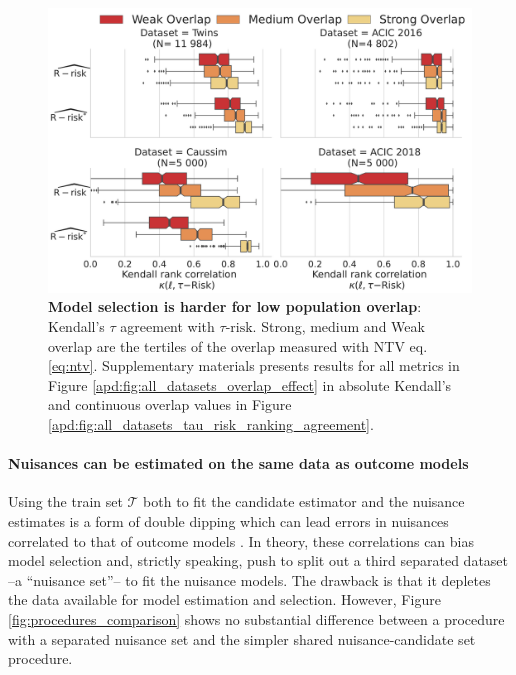 \documentclass[a4paper,num-refs]{oup-contemporary}%
\begin{document}
\begin{figure}[!h]
    \centering\begin{minipage}{\linewidth}
        \includegraphics[width=\linewidth]{_2_overlap_influence_by_bin_k_by_ds_r_risk_2cols.pdf}
    \end{minipage}
    \caption{\textbf{Model selection is harder for low population
            overlap}:
        Kendall's $\tau$ agreement with $\tau\text{-risk}$. Strong, medium and Weak overlap
        are the tertiles of the overlap measured with NTV eq. \ref{eq:ntv}. Supplementary materials presents results for all
        metrics in Figure \ref{apd:fig:all_datasets_overlap_effect} in absolute
        Kendall's and continuous overlap values in Figure
            {\ref{apd:fig:all_datasets_tau_risk_ranking_agreement}}.}\label{fig:all_datasets_overlap_effect_r_risk}
\end{figure}



\paragraph{Nuisances can be estimated on the same data as outcome models}

Using the train set $\mathcal{T}$ both to fit the candidate estimator and the
nuisance estimates is a form of double dipping which can lead errors in
nuisances correlated to that of outcome models
\cite{nie_quasioracle_2017}. In theory, these correlations can bias model
selection and, strictly speaking, push
to split out a third separated dataset --a ``nuisance set''-- to fit the
nuisance models. The drawback is that it depletes the data available for
model estimation and selection. However, Figure
\ref{fig:procedures_comparison} shows no substantial difference between a procedure with a separated
nuisance set and the simpler shared nuisance-candidate set procedure.
\end{document}
